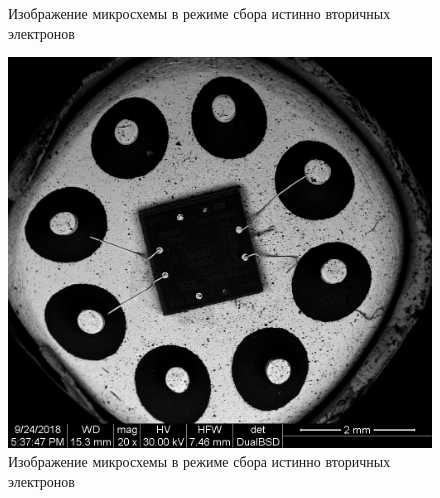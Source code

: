 \documentclass[a4paper, 12pt]{article}
\begin{document}
\begin{figure}[!htb]
			\caption{Изображение микросхемы в режиме сбора истинно вторичных электронов}
		\endminipage\hfill
			\includegraphics[width=\linewidth]{b_001.tif}
			\caption{Изображение микросхемы в режиме сбора истинно вторичных электронов}
		\endminipage
	\end{figure}
\end{document}
